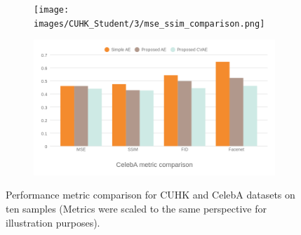 \documentclass{IEEEcsmag}
\begin{document}
\begin{figure}[ht]
    \centering
    \begin{subfigure}{0.48\textwidth}
        \centering
        \texttt{[image: images/CUHK\_Student/3/mse\_ssim\_comparison.png]}
        \label{fig:CUHKComparisonBar}
    \end{subfigure}
    \hfill
    \begin{subfigure}{0.48\textwidth}
        \centering
        \includegraphics[width=\linewidth]{images/CelebA/3/mse_ssim_comparison.png}
        \label{fig:CelebAComparisonBar}
    \end{subfigure}
    
    \caption{Performance metric comparison for CUHK and CelebA datasets on ten samples (Metrics were scaled to the same perspective for illustration purposes).}
    \label{fig:ComparisonBar}
\end{figure}
\end{document}
